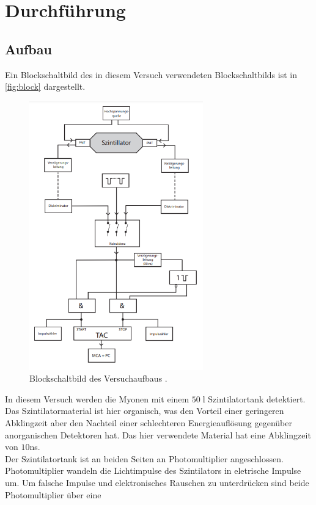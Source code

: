 \section{Durchführung}
\subsection{Aufbau}
Ein Blockschaltbild des in diesem Versuch verwendeten Blockschaltbilds ist in \autoref{fig:block}
dargestellt.
\begin{figure}
    \centering
    \includegraphics[width=0.67\textwidth]{block.png}
    \caption{Blockschaltbild des Versuchaufbaus \cite{anleitung}.}
    \label{fig:block}
\end{figure}
In diesem Versuch werden die Myonen mit einem $50 \;$l Szintilatortank detektiert. Das Szintilatormaterial 
ist hier organisch, was den Vorteil einer geringeren Abklingzeit aber den Nachteil einer schlechteren Energieauflösung 
gegenüber anorganischen Detektoren hat. Das hier verwendete Material hat eine Abklingzeit von $10$\;ns.\\
Der Szintilatortank ist an beiden Seiten an Photomultiplier angeschlossen. Photomultiplier wandeln die Lichtimpulse 
des Szintilators in eletrische Impulse um.
Um falsche Impulse und elektronisches Rauschen zu unterdrücken sind beide Photomultiplier über eine 
